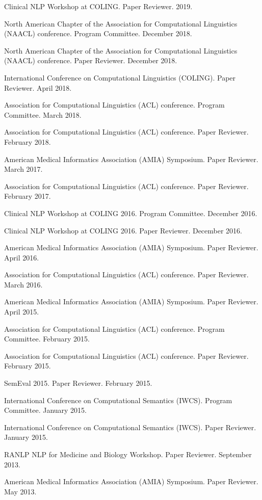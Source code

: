 \documentclass[letterpaper]{article}
\renewenvironment{itemize}{
  \begin{list}{}{
    \setlength{\leftmargin}{1.5em}
  }
}{
  \end{list}
}
\begin{document}
\begin{itemize}
\item Clinical NLP Workshop at COLING. Paper Reviewer. 2019.
\item North American Chapter of the Association for Computational Linguistics (NAACL) conference. Program Committee. December 2018.
\item North American Chapter of the Association for Computational Linguistics (NAACL) conference. Paper Reviewer. December 2018.
\item International Conference on Computational Linguistics (COLING). Paper Reviewer. April 2018.
\item Association for Computational Linguistics (ACL) conference. Program Committee. March 2018.
\item Association for Computational Linguistics (ACL) conference. Paper Reviewer. February 2018.
\item American Medical Informatics Association (AMIA) Symposium. Paper Reviewer. March 2017.
\item Association for Computational Linguistics (ACL) conference. Paper Reviewer. February 2017.
\item Clinical NLP Workshop at COLING 2016. Program Committee. December 2016.
\item Clinical NLP Workshop at COLING 2016. Paper Reviewer. December 2016.
\item American Medical Informatics Association (AMIA) Symposium. Paper Reviewer. April 2016.
\item Association for Computational Linguistics (ACL) conference. Paper Reviewer. March 2016.
\item American Medical Informatics Association (AMIA) Symposium. Paper Reviewer. April 2015.
\item Association for Computational Linguistics (ACL) conference. Program Committee. February 2015.
\item Association for Computational Linguistics (ACL) conference. Paper Reviewer. February 2015.
\item SemEval 2015. Paper Reviewer. February 2015.
\item International Conference on Computational Semantics (IWCS). Program Committee. January 2015.
\item International Conference on Computational Semantics (IWCS). Paper Reviewer. January 2015.
\item RANLP NLP for Medicine and Biology Workshop. Paper Reviewer. September 2013.
\item American Medical Informatics Association (AMIA) Symposium. Paper Reviewer. May 2013.

\end{itemize}
\end{document}
